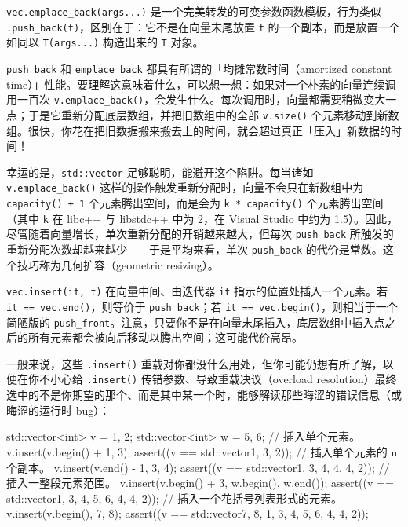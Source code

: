 \texttt{vec.\allowbreak{}emplace\_\allowbreak{}back(\allowbreak{}args...)\allowbreak{}} 是一个完美转发的可变参数函数模板，行为类似 \texttt{.push\_\allowbreak{}back(\allowbreak{}t)\allowbreak{}}，区别在于：它不是在向量末尾放置 \texttt{t} 的一个副本，而是放置一个如同以 \texttt{T(\allowbreak{}args...)\allowbreak{}} 构造出来的 \texttt{T} 对象。

\texttt{push\_\allowbreak{}back} 和 \texttt{emplace\_\allowbreak{}back} 都具有所谓的「均摊常数时间（amortized constant time）」性能。要理解这意味着什么，可以想一想：如果对一个朴素的向量连续调用一百次 \texttt{v.\allowbreak{}emplace\_\allowbreak{}back(\allowbreak{})\allowbreak{}}，会发生什么。每次调用时，向量都需要稍微变大一点；于是它重新分配底层数组，并把旧数组中的全部 \texttt{v.\allowbreak{}size(\allowbreak{})\allowbreak{}} 个元素移动到新数组。很快，你花在把旧数据搬来搬去上的时间，就会超过真正「压入」新数据的时间！

幸运的是，\texttt{std::\allowbreak{}vector} 足够聪明，能避开这个陷阱。每当诸如 \texttt{v.\allowbreak{}emplace\_\allowbreak{}back(\allowbreak{})\allowbreak{}} 这样的操作触发重新分配时，向量不会只在新数组中为 \texttt{capacity(\allowbreak{})\allowbreak{} + 1} 个元素腾出空间，而是会为 \texttt{k * capacity(\allowbreak{})\allowbreak{}} 个元素腾出空间（其中 \texttt{k} 在 libc++ 与 libstdc++ 中为 2，在 Visual Studio 中约为 1.5）。因此，尽管随着向量增长，单次重新分配的开销越来越大，但每次 \texttt{push\_\allowbreak{}back} 所触发的重新分配次数却越来越少——于是平均来看，单次 \texttt{push\_\allowbreak{}back} 的代价是常数。这个技巧称为几何扩容（geometric resizing）。

\texttt{vec.\allowbreak{}insert(\allowbreak{}it,\allowbreak{} t)\allowbreak{}} 在向量中间、由迭代器 \texttt{it} 指示的位置处插入一个元素。若 \texttt{it == vec.\allowbreak{}end(\allowbreak{})\allowbreak{}}，则等价于 \texttt{push\_\allowbreak{}back}；若 \texttt{it == vec.\allowbreak{}begin(\allowbreak{})\allowbreak{}}，则相当于一个简陋版的 \texttt{push\_\allowbreak{}front}。注意，只要你不是在向量末尾插入，底层数组中插入点之后的所有元素都会被向后移动以腾出空间；这可能代价高昂。

一般来说，这些 \texttt{.insert(\allowbreak{})\allowbreak{}} 重载对你都没什么用处，但你可能仍想有所了解，以便在你不小心给 \texttt{.insert(\allowbreak{})\allowbreak{}} 传错参数、导致重载决议（overload resolution）最终选中的不是你期望的那个、而是其中某一个时，能够解读那些晦涩的错误信息（或晦涩的运行时 bug）：

\begin{codebox}[cpp]
    std::vector<int> v = {1, 2};
    std::vector<int> w = {5, 6};
    // 插入单个元素。
    v.insert(v.begin() + 1, 3);
    assert((v == std::vector{1, 3, 2}));
    // 插入单个元素的 n 个副本。
    v.insert(v.end() - 1, 3, 4);
    assert((v == std::vector{1, 3, 4, 4, 4, 2}));
    // 插入一整段元素范围。
    v.insert(v.begin() + 3, w.begin(), w.end());
    assert((v == std::vector{1, 3, 4, 5, 6, 4, 4, 2}));
    // 插入一个花括号列表形式的元素。
    v.insert(v.begin(), {7, 8});
    assert((v == std::vector{7, 8, 1, 3, 4, 5, 6, 4, 4, 2}));
\end{codebox}

